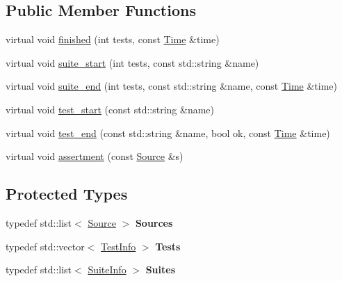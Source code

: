 \subsection*{Public Member Functions}
\begin{DoxyCompactItemize}
\item 
virtual void \hyperlink{class_test_1_1_collector_output_a758efaaf1e348636cb3877c622d2b5d0}{finished} (int tests, const \hyperlink{class_test_1_1_time}{Time} \&time)
\item 
virtual void \hyperlink{class_test_1_1_collector_output_ab4ea305009efd9e56c0549a04c9d55e6}{suite\+\_\+start} (int tests, const std\+::string \&name)
\item 
virtual void \hyperlink{class_test_1_1_collector_output_a25d129d55214c92189265a7bccd5b2cd}{suite\+\_\+end} (int tests, const std\+::string \&name, const \hyperlink{class_test_1_1_time}{Time} \&time)
\item 
virtual void \hyperlink{class_test_1_1_collector_output_a512aa60f06439a22c41dc5c3bfca15ff}{test\+\_\+start} (const std\+::string \&name)
\item 
virtual void \hyperlink{class_test_1_1_collector_output_aa6f64879932cde17fc0098b8fc197c62}{test\+\_\+end} (const std\+::string \&name, bool ok, const \hyperlink{class_test_1_1_time}{Time} \&time)
\item 
virtual void \hyperlink{class_test_1_1_collector_output_a201ecd71ad6e443b0be2e987d2dc3b39}{assertment} (const \hyperlink{class_test_1_1_source}{Source} \&s)
\end{DoxyCompactItemize}
\subsection*{Protected Types}
\begin{DoxyCompactItemize}
\item 
typedef std\+::list$<$ \hyperlink{class_test_1_1_source}{Source} $>$ {\bfseries Sources}\hypertarget{class_test_1_1_collector_output_a1921f35e0da596bd75da5824afe872c9}{}\label{class_test_1_1_collector_output_a1921f35e0da596bd75da5824afe872c9}

\item 
typedef std\+::vector$<$ \hyperlink{struct_test_1_1_collector_output_1_1_test_info}{Test\+Info} $>$ {\bfseries Tests}\hypertarget{class_test_1_1_collector_output_a54a7b7c9b6d181102bc8934190b06e86}{}\label{class_test_1_1_collector_output_a54a7b7c9b6d181102bc8934190b06e86}

\item 
typedef std\+::list$<$ \hyperlink{struct_test_1_1_collector_output_1_1_suite_info}{Suite\+Info} $>$ {\bfseries Suites}\hypertarget{class_test_1_1_collector_output_a0879ce3b51f1e3b3fe14aa5665dccd30}{}\label{class_test_1_1_collector_output_a0879ce3b51f1e3b3fe14aa5665dccd30}

\end{DoxyCompactItemize}

